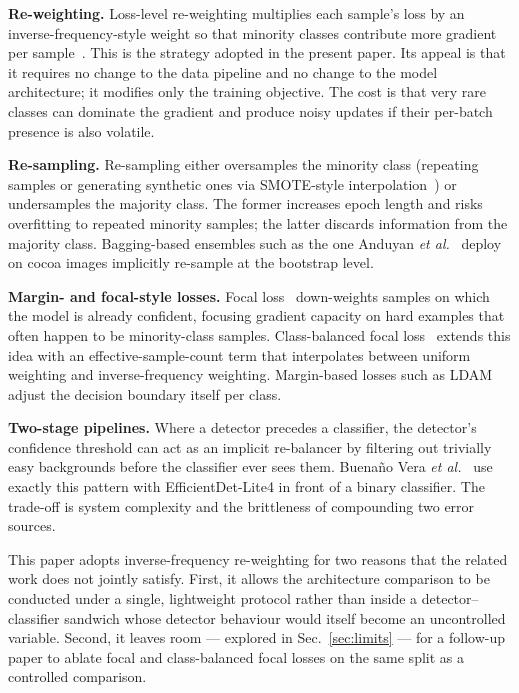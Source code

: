 \documentclass[conference,10pt]{IEEEtran}
\begin{document}
\textbf{Re-weighting.} Loss-level re-weighting multiplies each sample's loss
by an inverse-frequency-style weight so that minority classes contribute more
gradient per sample~\cite{cuiclassbalanced2019}. This is the strategy adopted
in the present paper. Its appeal is that it requires no change to the data
pipeline and no change to the model architecture; it modifies only the
training objective. The cost is that very rare classes can dominate the
gradient and produce noisy updates if their per-batch presence is also
volatile.

\textbf{Re-sampling.} Re-sampling either oversamples the minority class
(repeating samples or generating synthetic ones via SMOTE-style
interpolation~\cite{chawlasmote2002}) or undersamples the majority class. The
former increases epoch length and risks overfitting to repeated minority
samples; the latter discards information from the majority class.
Bagging-based ensembles such as the one Anduyan \emph{et al.}~\cite{anduyan2025}
deploy on cocoa images implicitly re-sample at the bootstrap level.

\textbf{Margin- and focal-style losses.} Focal loss~\cite{linfocal2017}
down-weights samples on which the model is already confident, focusing
gradient capacity on hard examples that often happen to be minority-class
samples. Class-balanced focal loss~\cite{cuiclassbalanced2019} extends this
idea with an effective-sample-count term that interpolates between uniform
weighting and inverse-frequency weighting. Margin-based losses such as LDAM
adjust the decision boundary itself per class.

\textbf{Two-stage pipelines.} Where a detector precedes a classifier, the
detector's confidence threshold can act as an implicit re-balancer by
filtering out trivially easy backgrounds before the classifier ever sees
them. Buena\~no Vera \emph{et al.}~\cite{buenano2024} use exactly this
pattern with EfficientDet-Lite4 in front of a binary classifier. The
trade-off is system complexity and the brittleness of compounding two error
sources.

This paper adopts inverse-frequency re-weighting for two reasons that the
related work does not jointly satisfy. First, it allows the architecture
comparison to be conducted under a single, lightweight protocol rather than
inside a detector--classifier sandwich whose detector behaviour would itself
become an uncontrolled variable. Second, it leaves room — explored in
Sec.~\ref{sec:limits} — for a follow-up paper to ablate focal and
class-balanced focal losses on the same split as a controlled comparison.
\end{document}
